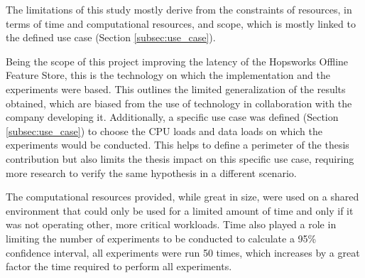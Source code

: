 The limitations of this study mostly derive from the constraints of resources, in terms of time and computational resources, and scope, which is mostly linked to the defined use case (Section \ref{subsec:use_case}). 

Being the scope of this project improving the latency of the Hopsworks Offline Feature Store, this is the technology on which the implementation and the experiments were based. This outlines the limited generalization of the results obtained, which are biased from the use of technology in collaboration with the company developing it. Additionally, a specific use case was defined (Section \ref{subsec:use_case}) to choose the \gls{CPU} loads and data loads on which the experiments would be conducted. This helps to define a perimeter of the thesis contribution but also limits the thesis impact on this specific use case, requiring more research to verify the same hypothesis in a different scenario.

The computational resources provided, while great in size, were used on a shared environment that could only be used for a limited amount of time and only if it was not operating other, more critical workloads. Time also played a role in limiting the number of experiments to be conducted to calculate a 95\% confidence interval, all experiments were run 50 times, which increases by a great factor the time required to perform all experiments. 